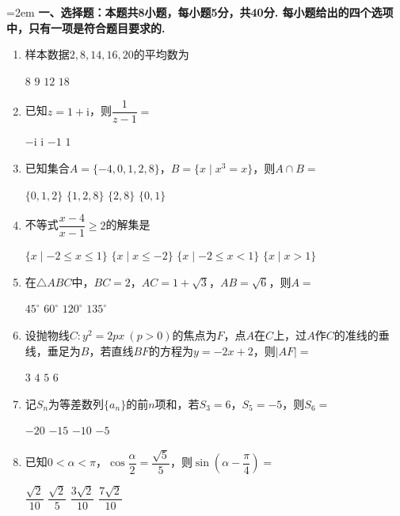 \documentclass[12pt,a4paper]{article}
\begin{document}
	\noindent\hangindent=2em {\bfseries 一、选择题：本题共8小题，每小题5分，共40分. 每小题给出的四个选项中，只有一项是符合题目要求的.}
	\begin{enumerate}[leftmargin=*,label=\arabic*.,itemsep=0.8ex]
		\item 样本数据$2,8,14,16,20$的平均数为
		\begin{choicesFour}
			\choice $8$ \choice $9$ \choice $12$ \choice $18$
		\end{choicesFour}
		\item 已知$z=1+\mathrm{i}$，则$\dfrac{1}{z-1}=$
		\begin{choicesFour}
			\choice $-\mathrm{i}$ \choice $\mathrm{i}$ \choice $-1$ \choice $1$
		\end{choicesFour}
		\item 已知集合$A=\{-4,0,1,2,8\}$，$B=\{x\mid x^3=x\}$，则$A\cap B=$
		\begin{choicesFour}
			\choice $\{0,1,2\}$ \choice $\{1,2,8\}$ \choice $\{2,8\}$ \choice $\{0,1\}$
		\end{choicesFour}
		\item 不等式$\dfrac{x-4}{x-1}\ge2$的解集是
		\begin{choicesFour}
			\choice $\{x\mid -2\le x\le1\}$ \choice $\{x\mid x\le-2\}$ \choice $\{x\mid -2\le x<1\}$ \choice $\{x\mid x>1\}$
		\end{choicesFour}
		\item 在$\triangle ABC$中，$BC=2$，$AC=1+\sqrt3$，$AB=\sqrt6$，则$A=$
		\begin{choicesFour}
			\choice $45^\circ$ \choice $60^\circ$ \choice $120^\circ$ \choice $135^\circ$
		\end{choicesFour}
		\item 设抛物线$C:y^2=2px\ (p>0)$的焦点为$F$，点$A$在$C$上，过$A$作$C$的准线的垂线，垂足为$B$，若直线$BF$的方程为$y=-2x+2$，则$|AF|=$
		\begin{choicesFour}
			\choice $3$ \choice $4$ \choice $5$ \choice $6$
		\end{choicesFour}
		\item 记$S_n$为等差数列$\{a_n\}$的前$n$项和，若$S_3=6$，$S_5=-5$，则$S_6=$
		\begin{choicesFour}
			\choice $-20$ \choice $-15$ \choice $-10$ \choice $-5$
		\end{choicesFour}
		\item 已知$0<\alpha<\pi$，$\cos\dfrac{\alpha}{2}=\dfrac{\sqrt5}{5}$，则$\sin\left(\alpha-\dfrac{\pi}{4}\right)=$
		\begin{choicesFour}
			\choice $\dfrac{\sqrt2}{10}$ \choice $\dfrac{\sqrt2}{5}$ \choice $\dfrac{3\sqrt2}{10}$ \choice $\dfrac{7\sqrt2}{10}$
		\end{choicesFour}
	\end{enumerate}
\end{document}
